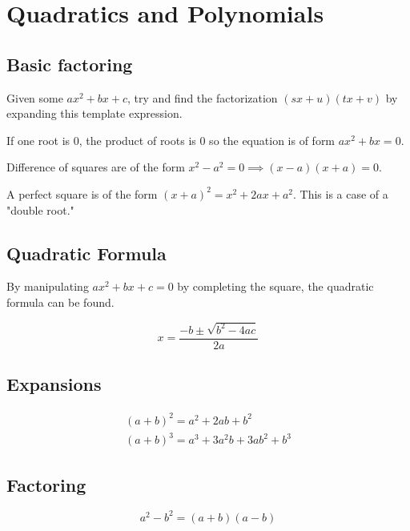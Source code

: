 \section{Quadratics and Polynomials}

\subsection{Basic factoring}

Given some $ax^2+bx+c$, try and find the factorization $(sx+u)(tx+v)$ by expanding this template expression.

\begin{remark}
    If one root is 0, the product of roots is 0 so
    the equation is of form $ax^2+bx=0$.
\end{remark}

\begin{remark}
    Difference of squares are of the form $x^2-a^2=0\implies (x-a)(x+a)=0$.
\end{remark}

\begin{remark}
    A perfect square is of the form $(x+a)^2=x^2+2ax+a^2$. This is a case of a "double root."
\end{remark}

\subsection{Quadratic Formula}

By manipulating $ax^2+bx+c=0$ by completing the square, the quadratic formula can be found.

\begin{equation}
    x=\frac{-b\pm \sqrt{b^2-4ac}}{2a}
\end{equation}

\subsection{Expansions}

\begin{eqnarray}
    (a+b)^2=a^2+2ab+b^2\\
    (a+b)^3 = a^3 + 3a^2b+3ab^2+b^3
\end{eqnarray}

\subsection{Factoring}

\begin{definition}
    \begin{equation}
        a^2-b^2=(a+b)(a-b)
    \end{equation}
\end{definition}

